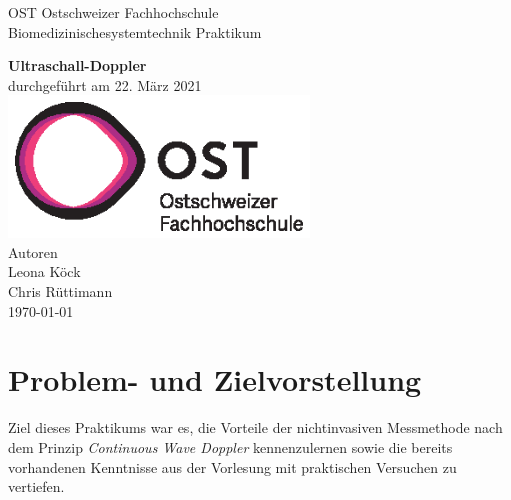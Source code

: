 \documentclass[11pt]{scrartcl}
\begin{document}
    \begin{titlepage}
        \begin{center}
        {\LARGE OST Ostschweizer Fachhochschule}
            \\[1.5cm]
            \linespread{1.2}\large { Biomedizinischesystemtechnik Praktikum }

            \huge{\bfseries Ultraschall-Doppler}
            \\%
            \large{durchgef{\"u}hrt am 22. März 2021}
            \\[1.5cm]
           \includegraphics[width=8cm]{../images/ost_logo.eps}
           \\[1cm]
            {\small{Autoren}}\\
            {\Large{Leona K{\"o}ck}}\\
            {\Large{Chris R{\"u}ttimann}}
            \\[1cm]

            \vspace*{\fill}
            \large{\today}
        \end{center}

    \end{titlepage}

    \addtocounter{section}{0}

    \tableofcontents
    \pagebreak



    \section{Problem- und Zielvorstellung}
    Ziel dieses Praktikums war es, die Vorteile der nichtinvasiven Messmethode nach dem Prinzip \emph{Continuous Wave Doppler}
    kennenzulernen sowie die bereits vorhandenen Kenntnisse aus der Vorlesung mit praktischen Versuchen zu vertiefen.
\end{document}
